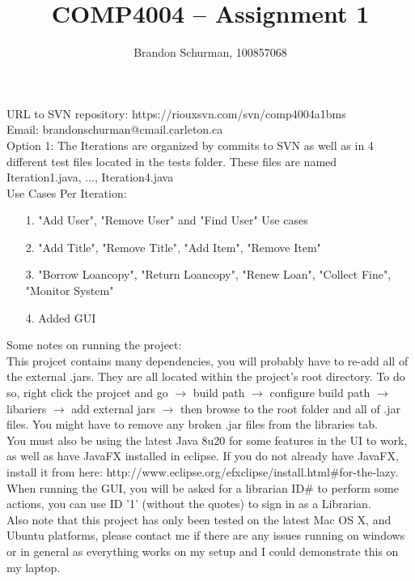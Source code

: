 \documentclass[12pt]{article}
\newenvironment{code}{ 
    \ttfamily
}{\vspace{5mm}}
\begin{document}
\title{COMP4004 -- Assignment 1}
\author{Brandon Schurman, 100857068}
\maketitle
\vspace{5mm}
URL to SVN repository: \begin{code}https://riouxsvn.com/svn/comp4004a1bms\end{code}
\vspace{10mm} \\
Email: \begin{code}brandonschurman@cmail.carleton.ca\end{code}
\vspace{10mm} \\
Option 1: The Iterations are organized by commits to SVN as well as in 4 different test files located in the tests folder. These files are named \begin{code}Iteration1.java, ..., Iteration4.java\end{code}
\vspace{5mm} \\
Use Cases Per Iteration:
\begin{itemize}
    \item[1.] "Add User", "Remove User" and "Find User" Use cases
    \item[2.] "Add Title", "Remove Title", "Add Item", "Remove Item"
    \item[3.] "Borrow Loancopy", "Return Loancopy", "Renew Loan", "Collect Fine", "Monitor System"
    \item[4.] Added GUI
\end{itemize}

\vspace{10mm}
Some notes on running the project: \\
This projcet contains many dependencies, you will probably have to re-add all of the external .jars. They are all located within the project's root directory. To do so, right click the projcet and go $\rightarrow$ build path $\rightarrow$ configure build path $\rightarrow$ libariers $\rightarrow$ add external jars $\rightarrow$ then browse to the root folder and all of .jar files. You might have to remove any broken .jar files from the libraries tab. \\
You must also be using the latest Java 8u20 for some features in the UI to work, as well as have JavaFX installed in eclipse. If you do not already have JavaFX, install it from here: \begin{code}http://www.eclipse.org/efxclipse/install.html\#for-the-lazy\end{code}. \\
When running the GUI, you will be asked for a librarian ID\# to perform some actions, you can use ID '1' (without the quotes) to sign in as a Librarian. \\
Also note that this project has only been tested on the latest Mac OS X, and Ubuntu platforms, please contact me if there are any issues running on windows or in general as everything works on my setup and I could demonstrate this on my laptop.
\end{document}
